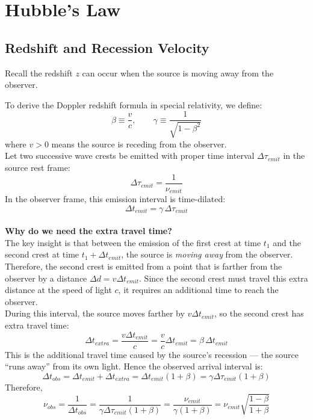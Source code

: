 \bigskip\noindent \bigskip\noindent \bigskip\noindent
\section{Hubble's Law}
\subsection{Redshift and Recession Velocity}
Recall the redshift $z$ can occur when the source is moving away from the observer.
\begin{foundation}
    To derive the Doppler redshift formula in special relativity, we define:
    \[
        \beta \equiv \frac{v}{c}, \qquad \gamma \equiv \frac{1}{\sqrt{1-\beta^2}}
    \]
    where $v>0$ means the source is receding from the observer. \\

    Let two successive wave crests be emitted with proper time interval $\Delta\tau_{emit}$ in the source rest frame:
    \[
        \Delta\tau_{emit} = \frac{1}{\nu_{emit}}
    \]
    In the observer frame, this emission interval is time-dilated:
    \[
        \Delta t_{emit} = \gamma\,\Delta\tau_{emit}
    \] \\
    
    \textbf{Why do we need the extra travel time?} \\
    The key insight is that between the emission of the first crest at time $t_1$ and the second crest at time $t_1 + \Delta t_{emit}$, the source is \textit{moving away} from the observer. 
    Therefore, the second crest is emitted from a point that is farther from the observer by a distance $\Delta d = v\Delta t_{emit}$.
    Since the second crest must travel this extra distance at the speed of light $c$, 
    it requires an additional time to reach the observer. \\
    
    During this interval, the source moves farther by $v\Delta t_{emit}$, so the second crest has extra travel time:
    \[
        \Delta t_{extra} = \frac{v\Delta t_{emit}}{c} = \frac{v}{c}\Delta t_{emit} = \beta\,\Delta t_{emit}
    \]
    This is the additional travel time caused by the source's recession --- the source ``runs away'' from its own light.
    Hence the observed arrival interval is:
    \[
        \Delta t_{obs} = \Delta t_{emit} + \Delta t_{extra} = \Delta t_{emit}(1+\beta)
        = \gamma\Delta\tau_{emit}(1+\beta)
    \]
    Therefore,
    \[
        \nu_{obs} = \frac{1}{\Delta t_{obs}} = \frac{1}{\gamma\Delta\tau_{emit}(1+\beta)} =\frac{\nu_{emit}}{\gamma(1+\beta)}
        = \nu_{emit}\sqrt{\frac{1-\beta}{1+\beta}}
    \] \\


\end{foundation}
